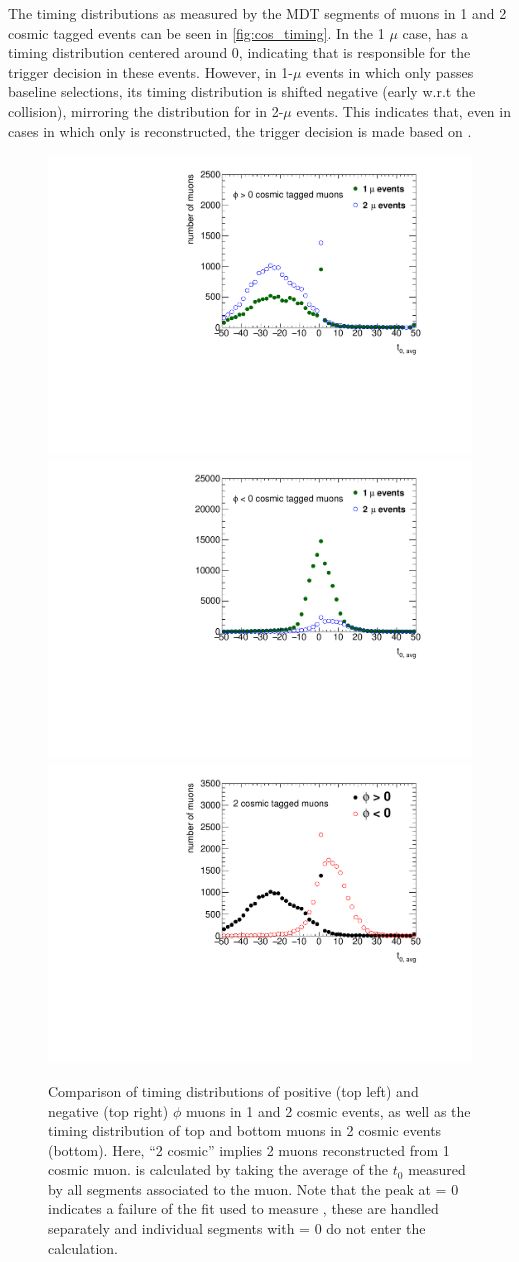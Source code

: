 The timing distributions as measured by the MDT segments of muons in 1 and 2 cosmic tagged events can be seen in \autoref{fig:cos_timing}. In the 1 $\mu$ case, \mb has a timing distribution centered around 0, indicating that \mb is responsible for the trigger decision in these events. However, in 1-$\mu$ events in which only \mt passes baseline selections, its timing distribution is shifted negative (early w.r.t the collision), mirroring the distribution for \mt in 2-$\mu$ events. This indicates that, even in cases in which only \mt is reconstructed, the trigger decision is made based on \mb. 

\begin{figure}[!ht]
\centering
\includegraphics[width=.48\textwidth]{figures/cosmics/t0_plusphi.pdf}
\includegraphics[width=.48\textwidth]{figures/cosmics/t0_negphi.pdf}
\includegraphics[width=.48\textwidth]{figures/cosmics/t0_2cos_plusminus.pdf}
\caption{Comparison of timing distributions of positive (top left) and negative (top right) $\phi$ muons in 1 and 2 cosmic events, as well as the timing distribution of top and bottom muons in 2 cosmic events (bottom). Here, ``2 cosmic'' implies 2 muons reconstructed from 1 cosmic muon. \tavg is calculated by taking the average of the $t_{0}$ measured by all segments associated to the muon. Note that the peak at \tavg = 0 indicates a failure of the fit used to measure \tavg, these are handled separately and individual segments with \tavg = 0 do not enter the \tavg calculation.}
\label{fig:cos_timing}
\end{figure}

